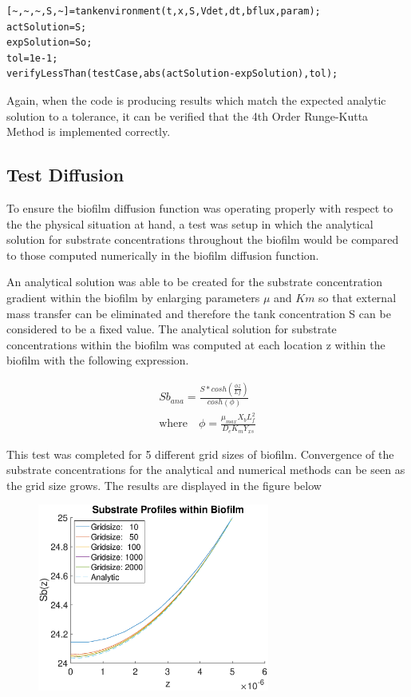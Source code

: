 \documentclass[letterpaper, twoside]{article}
\numberwithin{equation}{section}
\begin{document}
\begin{lstlisting}
[~,~,~,S,~]=tankenvironment(t,x,S,Vdet,dt,bflux,param);
actSolution=S; 
expSolution=So;
tol=1e-1;
verifyLessThan(testCase,abs(actSolution-expSolution),tol); 
\end{lstlisting}

Again, when the code is producing results which match the expected analytic solution to a tolerance, it can be verified that the 4th Order Runge-Kutta Method is implemented correctly.

\subsection{Test Diffusion}
To ensure the biofilm diffusion function was operating properly with respect to the the physical situation at hand, a test was setup in which the analytical solution for substrate concentrations throughout the biofilm would be compared to those computed numerically in the biofilm diffusion function.

An analytical solution was able to be created for the substrate concentration gradient within the biofilm by enlarging parameters $\mu$ and $Km$ so that external mass transfer can be eliminated and therefore the tank concentration S can be considered to be a fixed value. The analytical solution for substrate concentrations within the biofilm was computed at each location z within the biofilm with the following expression.

\begin{align}
{Sb_{ana}}=\frac{S*{cosh(\frac{{\phi}{z}}{Lf})}}{cosh(\phi)}\\
\text{where}{\quad} {\phi}=\frac{\mu_{max}{X_b}{L_f^{2}}}{{D_e}{K_m}{Y_{xs}}}
\end{align}

This test was completed for 5 different grid sizes of biofilm. Convergence of the substrate concentrations for the analytical and numerical methods can be seen as the grid size grows. The results are displayed in the figure below

\begin{figure}[H]
  \centering
  \includegraphics[read=eps, width=3in]{BiofilmDiffusion_Figure1.eps}
\end{figure}
\end{document}
